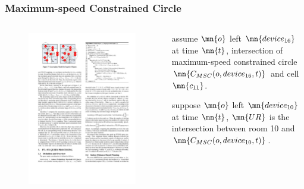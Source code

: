 \begin{frame}
\frametitle{Maximum-speed Constrained Circle}

\begin{columns}[c]

    \begin{figure}[tb]
      \includegraphics[width=\columnwidth,right]{figures/2-3/2-3-6.pdf}
    \end{figure}

  \begin{fitemize}
      \item assume $\mn{o}$ left $\mn{device_{16}}$ at time $\mn{t}$, intersection of maximum-speed constrained circle $\mn{C_{MSC}(o, device_{16}, t)}$ and cell $\mn{c_{11}}$.
      \item suppose $\mn{o}$ left $\mn{device_{10}}$ at time $\mn{t}$, $\mn{UR}$ is the intersection between room 10 and $\mn{C_{MSC}(o, device_{10}, t)}$.
    \end{fitemize}


\end{columns}
\end{frame}
